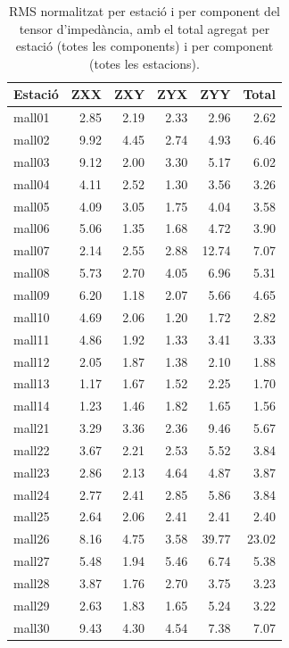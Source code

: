 \begin{table}[htbp]
  \centering
  \caption{RMS normalitzat per estació i per component del tensor d'impedància, amb el total agregat per estació (totes les components) i per component (totes les estacions).}
  \label{tab:rms_station}
  \begin{tabular}{lrrrrr}
    \toprule
    Estació & ZXX & ZXY & ZYX & ZYY & \textbf{Total} \\
    \midrule
    mall01 & 2.85 & 2.19 & 2.33 & 2.96 & 2.62 \\
    mall02 & 9.92 & 4.45 & 2.74 & 4.93 & 6.46 \\
    mall03 & 9.12 & 2.00 & 3.30 & 5.17 & 6.02 \\
    mall04 & 4.11 & 2.52 & 1.30 & 3.56 & 3.26 \\
    mall05 & 4.09 & 3.05 & 1.75 & 4.04 & 3.58 \\
    mall06 & 5.06 & 1.35 & 1.68 & 4.72 & 3.90 \\
    mall07 & 2.14 & 2.55 & 2.88 & 12.74 & 7.07 \\
    mall08 & 5.73 & 2.70 & 4.05 & 6.96 & 5.31 \\
    mall09 & 6.20 & 1.18 & 2.07 & 5.66 & 4.65 \\
    mall10 & 4.69 & 2.06 & 1.20 & 1.72 & 2.82 \\
    mall11 & 4.86 & 1.92 & 1.33 & 3.41 & 3.33 \\
    mall12 & 2.05 & 1.87 & 1.38 & 2.10 & 1.88 \\
    mall13 & 1.17 & 1.67 & 1.52 & 2.25 & 1.70 \\
    mall14 & 1.23 & 1.46 & 1.82 & 1.65 & 1.56 \\
    mall21 & 3.29 & 3.36 & 2.36 & 9.46 & 5.67 \\
    mall22 & 3.67 & 2.21 & 2.53 & 5.52 & 3.84 \\
    mall23 & 2.86 & 2.13 & 4.64 & 4.87 & 3.87 \\
    mall24 & 2.77 & 2.41 & 2.85 & 5.86 & 3.84 \\
    mall25 & 2.64 & 2.06 & 2.41 & 2.41 & 2.40 \\
    mall26 & 8.16 & 4.75 & 3.58 & 39.77 & 23.02 \\
    mall27 & 5.48 & 1.94 & 5.46 & 6.74 & 5.38 \\
    mall28 & 3.87 & 1.76 & 2.70 & 3.75 & 3.23 \\
    mall29 & 2.63 & 1.83 & 1.65 & 5.24 & 3.22 \\
    mall30 & 9.43 & 4.30 & 4.54 & 7.38 & 7.07 \\

\end{tabular}
\end{table}
